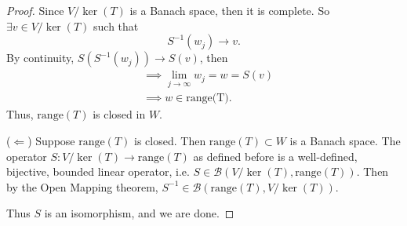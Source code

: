 \documentclass{article}
\begin{document}
\begin{proof}
	Since $V/\ker{(T)}$ is a Banach space, then it is complete. So $\exists v\in V/\ker{(T)}$ such that
	\begin{equation}
		S^{-1}(w_j) \rightarrow v.
	\end{equation}
	By continuity, $S\left(S^{-1}(w_j)\right)\rightarrow S(v)$, then
	\begin{align}
		&\implies \lim_{j\to\infty} w_j = w = S(v)\\
		&\implies w \in \textrm{range(T)}.
	\end{align}
	Thus, $\textrm{range}(T)$ is closed in $W$.
	
	($\Leftarrow$) Suppose $\textrm{range}(T)$ is closed. Then $\textrm{range}(T)\subset W$ is a Banach space. The operator $S: V/\ker{(T)} \longrightarrow \textrm{range}(T)$ as defined before is a well-defined, bijective, bounded linear operator, i.e. $S\in\mathcal{B}(V/\ker{(T)}, \textrm{range}(T))$.
	Then by the Open Mapping theorem, $S^{-1}\in \mathcal{B}(\textrm{range}(T), V/\ker{(T)})$.
	
	Thus $S$ is an isomorphism, and we are done.
\end{proof}
\end{document}
